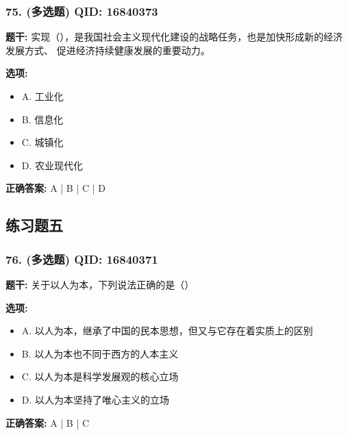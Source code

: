 \documentclass[12pt,UTF8]{ctexart}
\begin{document}
\subsubsection*{75. (多选题) \small QID: 16840373}

\textbf{题干:}
实现（），是我国社会主义现代化建设的战略任务，也是加快形成新的经济发展方式、 促进经济持续健康发展的重要动力。

\textbf{选项:}
\begin{itemize}[leftmargin=*]

  \item A. 工业化

  \item B. 信息化

  \item C. 城镇化

  \item D. 农业现代化

\end{itemize}

\textbf{正确答案:}
A | B | C | D

\vspace{0.3em}\hrulefill\vspace{0.7em}

\subsection*{练习题五}

\subsubsection*{76. (多选题) \small QID: 16840371}

\textbf{题干:}
关于以人为本，下列说法正确的是（）

\textbf{选项:}
\begin{itemize}[leftmargin=*]

  \item A. 以人为本，继承了中国的民本思想，但又与它存在着实质上的区别

  \item B. 以人为本也不同于西方的人本主义

  \item C. 以人为本是科学发展观的核心立场

  \item D. 以人为本坚持了唯心主义的立场

\end{itemize}

\textbf{正确答案:}
A | B | C
\end{document}
